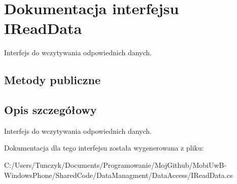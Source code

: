 \hypertarget{a00030}{}\section{Dokumentacja interfejsu I\+Read\+Data}
\label{a00030}


Interfejs do wczytywania odpowiednich danych.  


\subsection*{Metody publiczne}


\subsection{Opis szczegółowy}
Interfejs do wczytywania odpowiednich danych. 



Dokumentacja dla tego interfejsu została wygenerowana z pliku\+:\begin{DoxyCompactItemize}
\item 
C\+:/\+Users/\+Tunczyk/\+Documents/\+Programowanie/\+Moj\+Github/\+Mobi\+Uw\+B-\/\+Windows\+Phone/\+Shared\+Code/\+Data\+Managment/\+Data\+Access/I\+Read\+Data.\+cs\end{DoxyCompactItemize}
